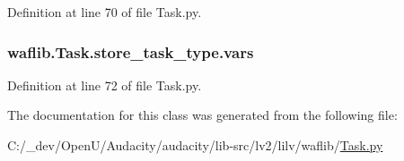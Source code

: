 Definition at line 70 of file Task.\+py.

\subsubsection[{\texorpdfstring{vars}{vars}}]{\setlength{\rightskip}{0pt plus 5cm}waflib.\+Task.\+store\+\_\+task\+\_\+type.\+vars}\hypertarget{classwaflib_1_1_task_1_1store__task__type_a8a6c5b6e5ade92e1e48e9ba26e85c618}{}\label{classwaflib_1_1_task_1_1store__task__type_a8a6c5b6e5ade92e1e48e9ba26e85c618}


Definition at line 72 of file Task.\+py.



The documentation for this class was generated from the following file\+:\begin{DoxyCompactItemize}
\item 
C\+:/\+\_\+dev/\+Open\+U/\+Audacity/audacity/lib-\/src/lv2/lilv/waflib/\hyperlink{lilv_2waflib_2_task_8py}{Task.\+py}\end{DoxyCompactItemize}
